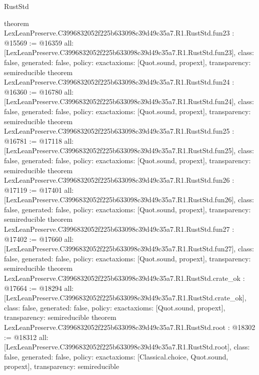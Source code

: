 \begin{lexlean}{RustStd}
\begin{coremodule}
{}
theorem LexLeanPreserve.C3996832052f225b633098c39d49c35a7.R1.RustStd.fun23 : @15569 := @16359 {
  all: [LexLeanPreserve.C3996832052f225b633098c39d49c35a7.R1.RustStd.fun23],
  class: false,
  generated: false,
  policy: exact{axioms: [Quot.sound, propext]},
  transparency: semireducible
}
theorem LexLeanPreserve.C3996832052f225b633098c39d49c35a7.R1.RustStd.fun24 : @16360 := @16780 {
  all: [LexLeanPreserve.C3996832052f225b633098c39d49c35a7.R1.RustStd.fun24],
  class: false,
  generated: false,
  policy: exact{axioms: [Quot.sound, propext]},
  transparency: semireducible
}
theorem LexLeanPreserve.C3996832052f225b633098c39d49c35a7.R1.RustStd.fun25 : @16781 := @17118 {
  all: [LexLeanPreserve.C3996832052f225b633098c39d49c35a7.R1.RustStd.fun25],
  class: false,
  generated: false,
  policy: exact{axioms: [Quot.sound, propext]},
  transparency: semireducible
}
theorem LexLeanPreserve.C3996832052f225b633098c39d49c35a7.R1.RustStd.fun26 : @17119 := @17401 {
  all: [LexLeanPreserve.C3996832052f225b633098c39d49c35a7.R1.RustStd.fun26],
  class: false,
  generated: false,
  policy: exact{axioms: [Quot.sound, propext]},
  transparency: semireducible
}
theorem LexLeanPreserve.C3996832052f225b633098c39d49c35a7.R1.RustStd.fun27 : @17402 := @17660 {
  all: [LexLeanPreserve.C3996832052f225b633098c39d49c35a7.R1.RustStd.fun27],
  class: false,
  generated: false,
  policy: exact{axioms: [Quot.sound, propext]},
  transparency: semireducible
}
theorem LexLeanPreserve.C3996832052f225b633098c39d49c35a7.R1.RustStd.crate_ok : @17664 := @18294 {
  all: [LexLeanPreserve.C3996832052f225b633098c39d49c35a7.R1.RustStd.crate_ok],
  class: false,
  generated: false,
  policy: exact{axioms: [Quot.sound, propext]},
  transparency: semireducible
}
theorem LexLeanPreserve.C3996832052f225b633098c39d49c35a7.R1.RustStd.root : @18302 := @18312 {
  all: [LexLeanPreserve.C3996832052f225b633098c39d49c35a7.R1.RustStd.root],
  class: false,
  generated: false,
  policy: exact{axioms: [Classical.choice, Quot.sound, propext]},
  transparency: semireducible
}


\end{coremodule}
\end{lexlean}
